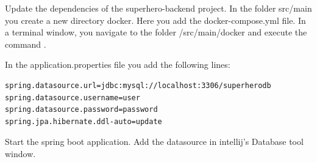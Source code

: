 \begin{oefening}
Update the dependencies of the superhero-backend project.
In the folder src/main you create a new directory docker. Here you add the docker-compose.yml file. In a terminal window, you navigate to the folder /src/main/docker and execute the command .

In the application.properties file you add the following lines:

\begin{lstlisting}
spring.datasource.url=jdbc:mysql://localhost:3306/superherodb
spring.datasource.username=user
spring.datasource.password=password
spring.jpa.hibernate.ddl-auto=update
\end{lstlisting}

Start the spring boot application. Add the datasource in intellij's Database tool window. 



\end{oefening}



